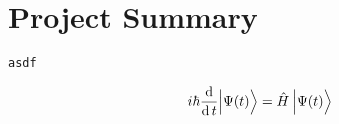 \section{Project Summary}

\lipsum[2]\texttt{asdf}

\begin{equation}
  i \hbar \frac{\dd}{\dd t}\ket[\Big]{\Psi(t)} = \hat{H}\: \ket[\Big]{\Psi(t)} 
\end{equation}
